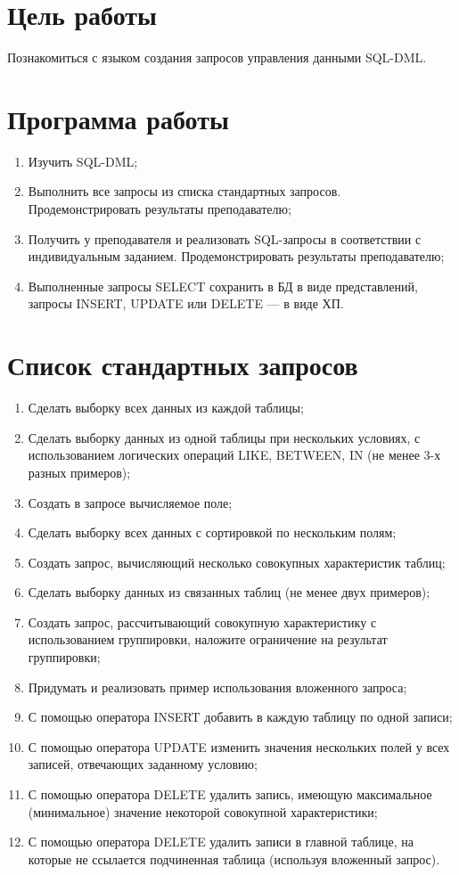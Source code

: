 \section{Цель работы}

Познакомиться с языком создания запросов управления данными SQL-DML.

\section{Программа работы}

\begin{enumerate}
	\item Изучить SQL-DML;
	\item Выполнить все запросы из списка стандартных запросов. Продемонстрировать результаты преподавателю;
	\item Получить у преподавателя и реализовать SQL-запросы в соответствии с индивидуальным заданием. Продемонстрировать результаты преподавателю;
	\item Выполненные запросы SELECT сохранить в БД в виде представлений, запросы INSERT, UPDATE или DELETE --- в виде ХП.
\end{enumerate}

\section{Список стандартных запросов}

\begin{enumerate}
	\item Сделать выборку всех данных из каждой таблицы;
	\item Сделать выборку данных из одной таблицы при нескольких условиях, с использованием логических операций LIKE, BETWEEN, IN (не менее 3-х разных примеров);
	\item Создать в запросе вычисляемое поле;
	\item Сделать выборку всех данных с сортировкой по нескольким полям;
	\item Создать запрос, вычисляющий несколько совокупных характеристик таблиц;
	\item Сделать выборку данных из связанных таблиц (не менее двух примеров);
	\item Создать запрос, рассчитывающий совокупную характеристику с использованием группировки, наложите ограничение на результат группировки;
	\item Придумать и реализовать пример использования вложенного запроса;
	\item С помощью оператора INSERT добавить в каждую таблицу по одной записи;
	\item С помощью оператора UPDATE изменить значения нескольких полей у всех записей, отвечающих заданному условию;
	\item С помощью оператора DELETE удалить запись, имеющую максимальное (минимальное) значение некоторой совокупной характеристики;
	\item С помощью оператора DELETE удалить записи в главной таблице, на которые не ссылается подчиненная таблица (используя вложенный запрос).
\end{enumerate}